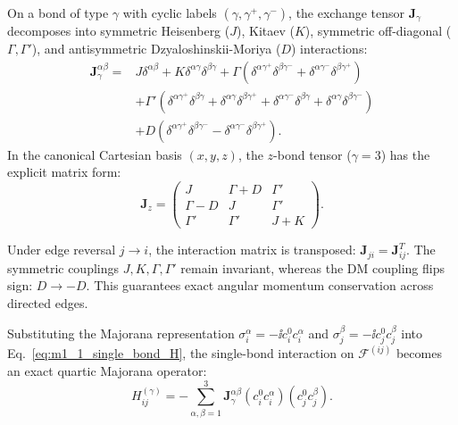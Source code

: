 \begin{definition}
\label{def:m1_1_exchange_tensor}
On a bond of type $\gamma$ with cyclic labels $(\gamma, \gamma^+, \gamma^-)$, the exchange tensor $\mathbf{J}_\gamma$ decomposes into symmetric Heisenberg ($J$), Kitaev ($K$), symmetric off-diagonal ($\Gamma, \Gamma'$), and antisymmetric Dzyaloshinskii-Moriya ($D$) interactions:
\begin{equation}
\label{eq:m1_1_J_tensor_components}
\begin{aligned}
\mathbf{J}_\gamma^{\alpha\beta} ={}& J \delta^{\alpha\beta} + K \delta^{\alpha\gamma} \delta^{\beta\gamma} + \Gamma (\delta^{\alpha\gamma^+} \delta^{\beta\gamma^-} + \delta^{\alpha\gamma^-} \delta^{\beta\gamma^+}) \\
&+ \Gamma' (\delta^{\alpha\gamma^+} \delta^{\beta\gamma} + \delta^{\alpha\gamma} \delta^{\beta\gamma^+} + \delta^{\alpha\gamma^-} \delta^{\beta\gamma} + \delta^{\alpha\gamma} \delta^{\beta\gamma^-}) \\
&+ D (\delta^{\alpha\gamma^+} \delta^{\beta\gamma^-} - \delta^{\alpha\gamma^-} \delta^{\beta\gamma^+}).
\end{aligned}
\end{equation}
In the canonical Cartesian basis $(x, y, z)$, the $z$-bond tensor ($\gamma = 3$) has the explicit matrix form:
\begin{equation}
\label{eq:m1_1_Jz_matrix}
\mathbf{J}_z = \begin{pmatrix} J & \Gamma + D & \Gamma' \\ \Gamma - D & J & \Gamma' \\ \Gamma' & \Gamma' & J + K \end{pmatrix}.
\end{equation}
\end{definition}

\begin{remark}
\label{rem:m1_1_bond_transposition}
Under edge reversal $j \to i$, the interaction matrix is transposed: $\mathbf{J}_{ji} = \mathbf{J}_{ij}^T$. The symmetric couplings $J, K, \Gamma, \Gamma'$ remain invariant, whereas the DM coupling flips sign: $D \to -D$. This guarantees exact angular momentum conservation across directed edges.
\end{remark}

Substituting the Majorana representation $\sigma_i^\alpha = -\ii c_i^0 c_i^\alpha$ and $\sigma_j^\beta = -\ii c_j^0 c_j^\beta$ into Eq.~\eqref{eq:m1_1_single_bond_H}, the single-bond interaction on $\mathcal{F}^{(ij)}$ becomes an exact quartic Majorana operator:
\begin{equation}
\label{eq:m1_1_bond_quartic}
H_{ij}^{(\gamma)} = -\sum_{\alpha,\beta=1}^3 \mathbf{J}_\gamma^{\alpha\beta} (c_i^0 c_i^\alpha)(c_j^0 c_j^\beta).
\end{equation}


